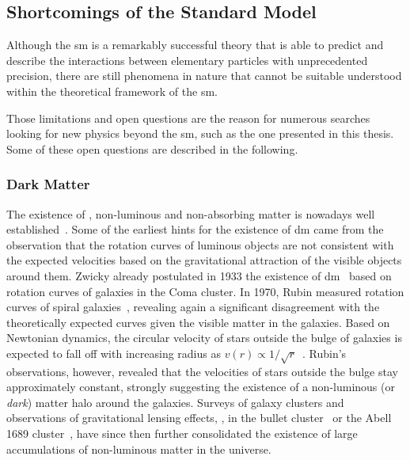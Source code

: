
\subsection{Shortcomings of the Standard Model}\label{sec:shortcomings_sm}

Although the \gls{sm} is a remarkably successful theory that is able to predict and describe the interactions between elementary particles with unprecedented precision, there are still phenomena in nature that cannot be suitable understood within the theoretical framework of the \gls{sm}. 

Those limitations and open questions are the reason for numerous searches looking for new physics beyond the \gls{sm}, such as the one presented in this thesis. Some of these open questions are described in the following. 

\subsubsection{Dark Matter}

The existence of , \ie non-luminous and non-absorbing matter is nowadays well established~\cite{pdg2020}. Some of the earliest hints for the existence of \gls{dm} came from the observation that the rotation curves of luminous objects are not consistent with the expected velocities based on the gravitational attraction of the visible objects around them. Zwicky already postulated in 1933 the existence of \gls{dm}~\cite{Zwicky:437297} based on rotation curves of galaxies in the Coma cluster. In 1970, Rubin measured rotation curves of spiral galaxies~\cite{Rubin:1970zza}, revealing again a significant disagreement with the theoretically expected curves given the visible matter in the galaxies. Based on Newtonian dynamics, the circular velocity of stars outside the bulge of galaxies is expected to fall off with increasing radius as $v(r) \propto 1/\sqrt{r}$~\cite{Bertone:2004pz}. Rubin's observations, however, revealed that the velocities of stars outside the bulge stay approximately constant, strongly suggesting the existence of a non-luminous (or \textit{dark}) matter halo around the galaxies. Surveys of galaxy clusters and observations of gravitational lensing effects, \eg, in the bullet cluster~\cite{Clowe:2006eq} or the Abell 1689 cluster~\cite{Taylor:1998uk}, have since then further consolidated the existence of large accumulations of non-luminous matter in the universe.

